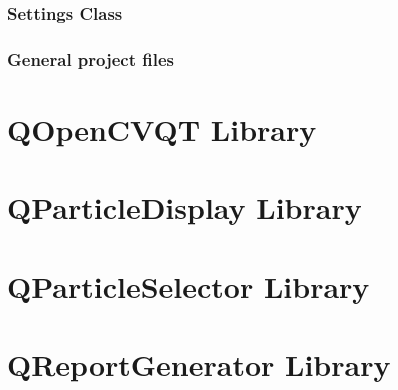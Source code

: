 \documentclass[11pt,fleqn,,a4paper,twoside,openright]{book}
\begin{document}
\subsection*{Settings Class}


\newpage
\subsection*{General project files}




\newpage

\chapter{QOpenCVQT Library}



\newpage

\chapter{QParticleDisplay Library}



\newpage

\chapter{QParticleSelector Library}



\newpage

\chapter{QReportGenerator Library}



\newpage
\end{document}
